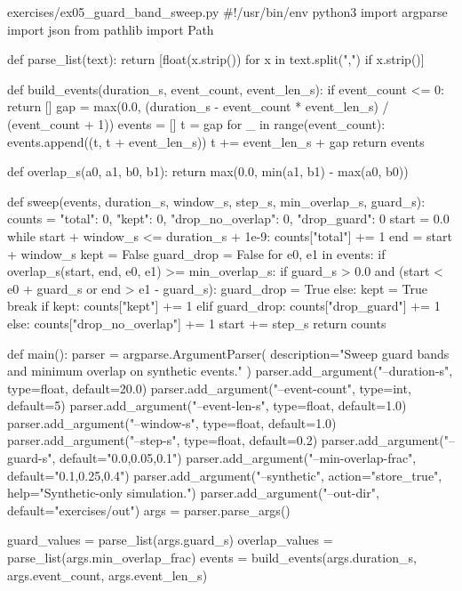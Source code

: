 \documentclass[11pt,openany]{book}
\begin{document}
\begin{filecontents*}{exercises/ex05_guard_band_sweep.py}
#!/usr/bin/env python3
import argparse
import json
from pathlib import Path


def parse_list(text):
    return [float(x.strip()) for x in text.split(",") if x.strip()]


def build_events(duration_s, event_count, event_len_s):
    if event_count <= 0:
        return []
    gap = max(0.0, (duration_s - event_count * event_len_s) / (event_count + 1))
    events = []
    t = gap
    for _ in range(event_count):
        events.append((t, t + event_len_s))
        t += event_len_s + gap
    return events


def overlap_s(a0, a1, b0, b1):
    return max(0.0, min(a1, b1) - max(a0, b0))


def sweep(events, duration_s, window_s, step_s, min_overlap_s, guard_s):
    counts = {"total": 0, "kept": 0, "drop_no_overlap": 0, "drop_guard": 0}
    start = 0.0
    while start + window_s <= duration_s + 1e-9:
        counts["total"] += 1
        end = start + window_s
        kept = False
        guard_drop = False
        for e0, e1 in events:
            if overlap_s(start, end, e0, e1) >= min_overlap_s:
                if guard_s > 0.0 and (start < e0 + guard_s or end > e1 - guard_s):
                    guard_drop = True
                else:
                    kept = True
                    break
        if kept:
            counts["kept"] += 1
        elif guard_drop:
            counts["drop_guard"] += 1
        else:
            counts["drop_no_overlap"] += 1
        start += step_s
    return counts


def main():
    parser = argparse.ArgumentParser(
        description="Sweep guard bands and minimum overlap on synthetic events."
    )
    parser.add_argument("--duration-s", type=float, default=20.0)
    parser.add_argument("--event-count", type=int, default=5)
    parser.add_argument("--event-len-s", type=float, default=1.0)
    parser.add_argument("--window-s", type=float, default=1.0)
    parser.add_argument("--step-s", type=float, default=0.2)
    parser.add_argument("--guard-s", default="0.0,0.05,0.1")
    parser.add_argument("--min-overlap-frac", default="0.1,0.25,0.4")
    parser.add_argument("--synthetic", action="store_true", help="Synthetic-only simulation.")
    parser.add_argument("--out-dir", default="exercises/out")
    args = parser.parse_args()

    guard_values = parse_list(args.guard_s)
    overlap_values = parse_list(args.min_overlap_frac)
    events = build_events(args.duration_s, args.event_count, args.event_len_s)


\end{filecontents*}
\end{document}
